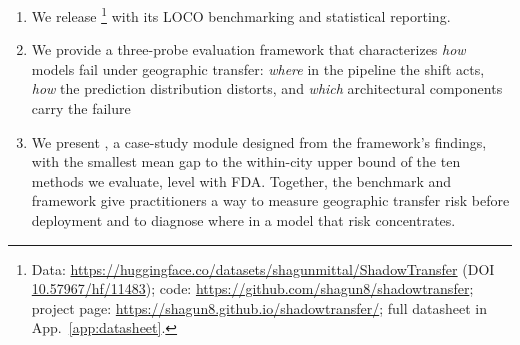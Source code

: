 \begin{enumerate}
    \item We release \shadow{}\footnote{Data: \url{https://huggingface.co/datasets/shagunmittal/ShadowTransfer} (DOI \href{https://doi.org/10.57967/hf/11483}{10.57967/hf/11483}); code: \url{https://github.com/shagun8/shadowtransfer}; project page: \url{https://shagun8.github.io/shadowtransfer/}; full datasheet in App.~\ref{app:datasheet}.} with its LOCO benchmarking and statistical reporting. 
    \item We provide a three-probe evaluation framework that characterizes \emph{how} models fail under geographic transfer: \textit{where} in the pipeline the shift acts, \textit{how} the prediction distribution distorts, and \textit{which} architectural components carry the failure
    \item We present \sib, a case-study module designed from the framework's findings, with the smallest mean gap to the within-city upper bound of the ten methods we evaluate, level with FDA. Together, the benchmark and framework give practitioners a way to measure geographic transfer risk before deployment and to diagnose where in a model that risk concentrates.
\end{enumerate}

